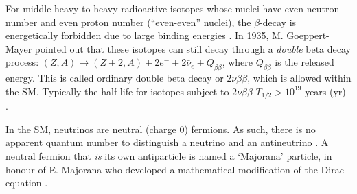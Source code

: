 For middle-heavy to heavy radioactive isotopes whose nuclei have even neutron number and even proton number (``even-even'' nuclei), the $\beta$-decay is energetically forbidden due to large binding energies \cite{fukugita2013physics}. In 1935, M. Goeppert-Mayer pointed out that these isotopes can still decay through a {\em double} beta decay process: $(Z,A) \to (Z+2,A)+2e^{-}+2\bar{\nu}_e+Q_{\beta\beta}$, where $Q_{\beta\beta}$ is the released energy. This is called ordinary double beta decay or $2\nu\beta\beta$, which is allowed within the SM. Typically the half-life for isotopes subject to $2\nu\beta\beta$ $T_{1/2}>10^{19}$ years (yr) \cite{povh2008particles,martin2019nuclear}.

In the SM, neutrinos are neutral (charge 0) fermions. As such, there is no apparent quantum number to distinguish a neutrino and an antineutrino \cite{akhmedov2014majorana}. A neutral fermion that {\em is} its own antiparticle is named a `Majorana' particle, in honour of E. Majorana who developed a mathematical modification of the Dirac equation \cite{majorana2006symmetric}.

